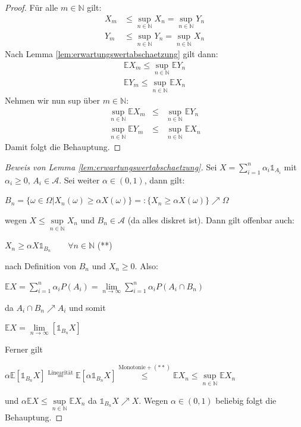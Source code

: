 \documentclass[10pt,a4paper]{report}
\numberwithin{equation}{section}
\numberwithin{figure}{section}
\theoremstyle{plain}
\theoremstyle{definition}
\theoremstyle{remark}
\theoremstyle{plain}
\newcommand{\1}{ \mathbb{1} } %
\begin{document}
\begin{proof}
  Für alle $m\in \mathbb{N}$ gilt:
  \begin{eqnarray*}
    X_m&\leq\sup\limits_{n\in \mathbb{N}} X_n=\sup\limits_{n\in \mathbb{N}} Y_n\\
    Y_m&\leq\sup\limits_{n\in \mathbb{N}} Y_n=\sup\limits_{n\in \mathbb{N}} X_n
  \end{eqnarray*}
  Nach Lemma \ref{lem:erwartungswertabschaetzung} gilt dann:
  \begin{eqnarray*}
    \mathbb{E}X_m\leq \sup\limits_{n\in \mathbb{N}}\mathbb{E} Y_n
  \end{eqnarray*}
  \begin{eqnarray*}
    \mathbb{E}Y_m\leq \sup\limits_{n\in \mathbb{N}}\mathbb{E} X_n
  \end{eqnarray*}
  Nehmen wir nun sup über $m \in \mathbb{N}$:
  \begin{eqnarray*}
    \sup\limits_{n\in \mathbb{N}}\mathbb{E}X_m &\leq &\sup\limits_{n\in \mathbb{N}}\mathbb{E}Y_n\\
    \sup\limits_{n\in \mathbb{N}}\mathbb{E}Y_m &\leq &\sup\limits_{n\in \mathbb{N}}\mathbb{E}X_n
  \end{eqnarray*}
  Damit folgt die Behauptung. 
\end{proof}
\begin{proof}[Beweis von Lemma \ref{lem:erwartungswertabschaetzung}]
  Sei $X=\sum\limits_{i=1}^n\alpha_i\1_{A_i}$ mit $\alpha_i \geq 0$,
  $A_i \in \mathcal{A}$. Sei weiter $\alpha \in (0,1)$, dann gilt:
  \begin{center}
    $B_n=\{\omega \in \Omega|X_n(\omega)\geq \alpha
    X(\omega)\}=:\{X_n\geq \alpha X(\omega)\}\nearrow \Omega$
  \end{center}
  wegen $X \leq \sup\limits_{n\in \mathbb{N}} X_n$ und $B_n \in
  \mathcal{A}$ (da alles diskret ist). Dann gilt offenbar auch:
  \begin{center}
    $X_n \geq \alpha X\1_{B_n} \qquad \forall n \in \mathbb{N}$ (**)
  \end{center}
  nach Definition von $B_n$ und $X_n\geq 0$. Also:
  \begin{center}
    $\mathbb{E}X=\sum\limits_{i=1}^n\alpha_i P(A_i)=\lim\limits_{n \to
      \infty} \sum\limits_{i=1}^n\alpha_i P(A_i\cap B_n)$
  \end{center}
  da $A_i\cap B_n \nearrow A_i$ und somit
  \begin{center}
    $\mathbb{E}X=\lim\limits_{n \to \infty}[\1_{B_n}X]$
  \end{center}
  Ferner gilt
  \begin{center}
    $\alpha
    \mathbb{E}[\1_{B_n}X]\overset{\text{Linearität}}{=}\mathbb{E}[\alpha
    \1_{B_n}X]\overset{\text{Monotonie}+(**)}{\leq}\mathbb{E}X_n\leq\sup\limits_{n\in
      \mathbb{N}}\mathbb{E}X_n$
  \end{center}
  und $\alpha \mathbb{E}X\leq \sup\limits_{n\in \mathbb{N}}\mathbb{E}X_n$ da $\1_{B_n}X\nearrow X$. Wegen $\alpha \in (0,1)$ beliebig folgt die Behauptung.
\end{proof}
\end{document}
